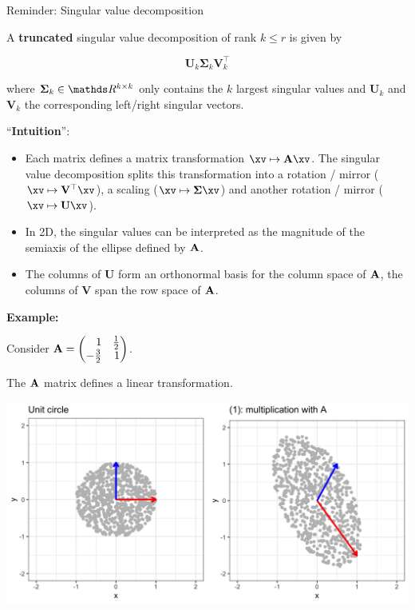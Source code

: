 \begin{vbframe}{Reminder: Singular value decomposition}
\framebreak

A \textbf{truncated} singular value decomposition of rank $k \le r$ is given by

$$
\mathbf{U}_k \boldsymbol{\Sigma}_k \mathbf{V}_k^\top
$$

where $\boldsymbol{\Sigma}_k \in \R^{k \times k}$ only contains the $k$ largest singular values and $\mathbf{U}_k$ and $\mathbf{V}_k$ the corresponding left/right singular vectors.

\framebreak

\enquote{\textbf{Intuition}}:

\begin{itemize}
\item Each matrix defines a matrix transformation $\xv \mapsto \Amat \xv$. The singular value decomposition splits this transformation into a rotation / mirror ($\xv \mapsto \mathbf{V}^\top \xv$), a scaling ($\xv \mapsto \boldsymbol{\Sigma} \xv$) and another rotation / mirror ($\xv \mapsto \mathbf{U}\xv$).
\item In 2D, the singular values can be interpreted as the magnitude of the semiaxis of the ellipse defined by $\mathbf{A}$.
\item The columns of $\mathbf{U}$ form an orthonormal basis for the column space of $\mathbf{A}$, the columns of $\mathbf{V}$ span the row space of $\mathbf{A}$.
\end{itemize}

\framebreak

\textbf{Example:}

Consider $\Amat = \begin{pmatrix*}[r]
1 & \frac{1}{2} \\
- \frac{3}{2} & 1 \end{pmatrix*}$.

The $\mathbf{A}$ matrix defines a linear transformation.


\begin{center}
\includegraphics{figure_man/ignore/matrixabbildung.png}
\end{center}


\end{vbframe}
